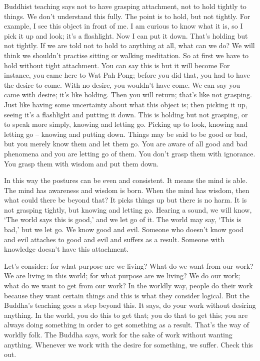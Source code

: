 Buddhist teaching says not to have grasping attachment, not to hold tightly to things. We don't understand this fully. The point is to hold, but not tightly. For example, I see this object in front of me. I am curious to know what it is, so I pick it up and look; it's a flashlight. Now I can put it down. That's holding but not tightly. If we are told not to hold to anything at all, what can we do? We will think we shouldn't practise sitting or walking meditation. So at first we have to hold without tight attachment. You can say this is  but it will become  For instance, you came here to Wat Pah Pong; before you did that, you had to have the desire to come. With no desire, you wouldn't have come. We can say you came with desire; it's like holding. Then you will return; that's like not grasping. Just like having some uncertainty about what this object is; then picking it up, seeing it's a flashlight and putting it down. This is holding but not grasping, or to speak more simply, knowing and letting go. Picking up to look, knowing and letting go -- knowing and putting down. Things may be said to be good or bad, but you merely know them and let them go. You are aware of all good and bad phenomena and you are letting go of them. You don't grasp them with ignorance. You grasp them with wisdom and put them down.

In this way the postures can be even and consistent. It means the mind is able. The mind has awareness and wisdom is born. When the mind has wisdom, then what could there be beyond that? It picks things up but there is no harm. It is not grasping tightly, but knowing and letting go. Hearing a sound, we will know, `The world says this is good,' and we let go of it. The world may say, `This is bad,' but we let go. We know good and evil. Someone who doesn't know good and evil attaches to good and evil and suffers as a result. Someone with knowledge doesn't have this attachment.

Let's consider: for what purpose are we living? What do we want from our work? We are living in this world; for what purpose are we living? We do our work; what do we want to get from our work? In the worldly way, people do their work because they want certain things and this is what they consider logical. But the Buddha's teaching goes a step beyond this. It says, do your work without desiring anything. In the world, you do this to get that; you do that to get this; you are always doing something in order to get something as a result. That's the way of worldly folk. The Buddha says, work for the sake of work without wanting anything. Whenever we work with the desire for something, we suffer. Check this out.
